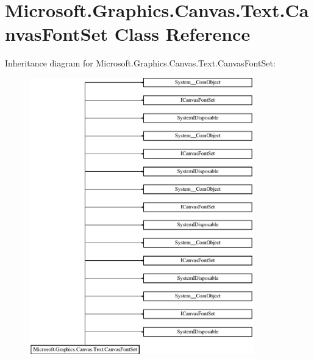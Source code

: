 \hypertarget{class_microsoft_1_1_graphics_1_1_canvas_1_1_text_1_1_canvas_font_set}{}\section{Microsoft.\+Graphics.\+Canvas.\+Text.\+Canvas\+Font\+Set Class Reference}
\label{class_microsoft_1_1_graphics_1_1_canvas_1_1_text_1_1_canvas_font_set}
Inheritance diagram for Microsoft.\+Graphics.\+Canvas.\+Text.\+Canvas\+Font\+Set\+:\begin{figure}[H]
\begin{center}
\leavevmode
\includegraphics[height=12.000000cm]{class_microsoft_1_1_graphics_1_1_canvas_1_1_text_1_1_canvas_font_set}
\end{center}
\end{figure}
